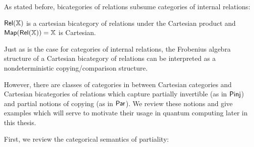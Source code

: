 As stated before, bicategories of relations subsume categories of internal relations:
\begin{example}
$\mathsf{Rel}(\mathbb{X})$ is a cartesian bicategory of relations under the Cartesian product and ${\sf Map}(\mathsf{Rel}(\mathbb{X}))=\mathbb{X}$ is Cartesian.
\end{example}


Just as is the case for categories of internal relations, the Frobenius algebra structure of a Cartesian bicategory of relations can be interpreted as a nondeterministic copying/comparison structure. 

However, there are classes of categories in between Cartesian categories and Cartesian bicategories of relations which capture partially invertible (as in $\mathsf{Pinj}$) and partial notions of copying (as in $\mathsf{Par}$).  We review these notions and give examples which will serve to motivate their usage in quantum computing later in this thesis.





First, we review the categorical semantics of partiality:

\label{sec:rest}



